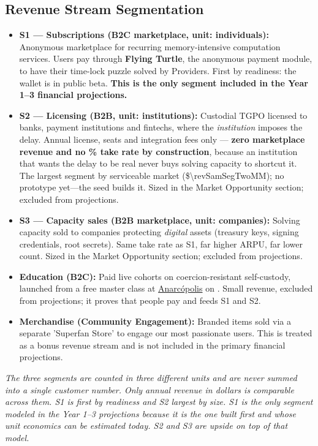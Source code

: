 \subsection{Revenue Stream Segmentation}
\begin{itemize}
  \item \textbf{S1 --- Subscriptions (B2C marketplace, unit: individuals):} Anonymous marketplace for recurring memory-intensive computation services. Users pay through \textbf{Flying Turtle}, the anonymous payment module, to have their time-lock puzzle solved by Providers. First by readiness: the wallet is in public beta. \textbf{This is the only segment included in the Year 1--3 financial projections.}
  \item \textbf{S2 --- Licensing (B2B, unit: institutions):} Custodial TGPO licensed to banks, payment institutions and fintechs, where the \emph{institution} imposes the delay. Annual license, seats and integration fees only --- \textbf{zero marketplace revenue and no \numint{\markPlatformFeePercent}\% take rate by construction}, because an institution that wants the delay to be real never buys solving capacity to shortcut it. The largest segment by serviceable market (\$\num[round-precision=1]{\revSamSegTwoM}M); no prototype yet---the seed builds it. Sized in the Market Opportunity section; excluded from projections.
  \item \textbf{S3 --- Capacity sales (B2B marketplace, unit: companies):} Solving capacity sold to companies protecting \emph{digital} assets (treasury keys, signing credentials, root secrets). Same take rate as S1, far higher ARPU, far lower count. Sized in the Market Opportunity section; excluded from projections.
  \item \textbf{Education (B2C):} Paid live cohorts on coercion-resistant self-custody, launched from a free master class at \href{\anarcurl}{Anarcópolis} on \masterclassDate. Small revenue, excluded from projections; it proves that people pay and feeds S1 and S2.
  \item \textbf{Merchandise (Community Engagement):} Branded items sold via a separate 'Superfan Store' to engage our most passionate users. This is treated as a bonus revenue stream and is not included in the primary financial projections.
\end{itemize}

\noindent\textit{The three segments are counted in three different units and are never summed into a single customer number. Only annual revenue in dollars is comparable across them. S1 is first by readiness and S2 largest by size. S1 is the only segment modeled in the Year 1--3 projections because it is the one built first and whose unit economics can be estimated today. S2 and S3 are upside on top of that model.}

